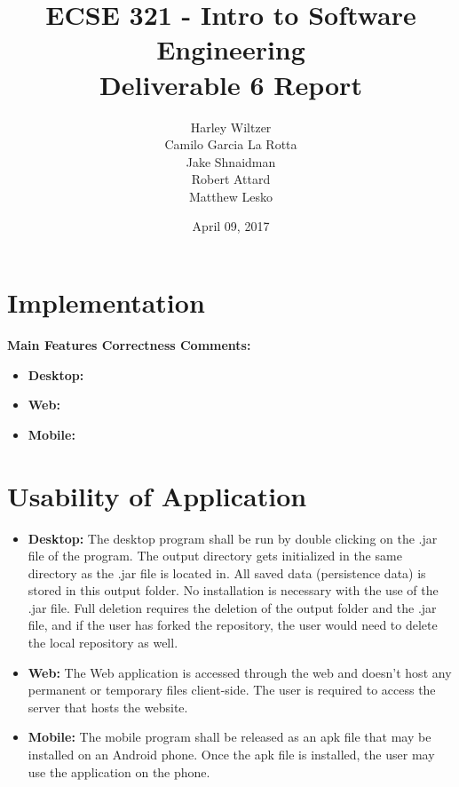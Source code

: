 \documentclass[12pt]{article}
\title{ECSE 321 - Intro to Software Engineering\\Deliverable 6 Report}
\author{Harley Wiltzer\\Camilo Garcia La Rotta\\Jake Shnaidman\\Robert Attard\\Matthew Lesko}
\date{April 09, 2017}
\begin{document}
\maketitle
\newpage
{} %
\tableofcontents
\newpage
\section{Implementation}
\textbf{Main Features Correctness Comments:}
\begin{itemize}
	\item \textbf{Desktop:}
	\item \textbf{Web:}
	\item \textbf{Mobile:}
\end{itemize}

\section{Usability of Application}

\begin{itemize}
	\item \textbf{Desktop:} The desktop program shall be run by double clicking on the .jar file of the program. The output directory gets initialized in the same directory as the .jar file is located in. All saved data (persistence data) is stored in this output folder. No installation is necessary with the use of the .jar file. Full deletion requires the deletion of the output folder and the .jar file, and if the user has forked the repository, the user would need to delete the local repository as well.
	\item \textbf{Web:} The Web application is accessed through the web and doesn't host any permanent or temporary files client-side. The user is required to access the server that hosts the website.
	\item \textbf{Mobile:} The mobile program shall be released as an apk file that may be installed on an Android phone. Once the apk file is installed, the user may use the application on the phone. 
\end{itemize}
\end{document}
